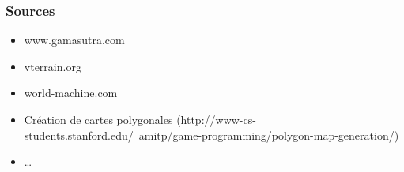 \documentclass{beamer}
\begin{document}
\begin{frame}
  \frametitle{Sources}
  \begin{itemize}
  \item www.gamasutra.com
  \item vterrain.org
  \item world-machine.com
  \item Création de cartes polygonales ({\footnotesize http://www-cs-students.stanford.edu/~amitp/game-programming/polygon-map-generation/})
  \item \dots
  \end{itemize}
\end{frame}
\end{document}
